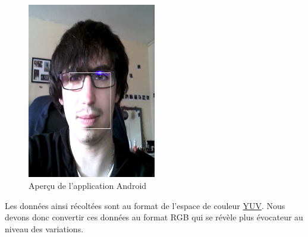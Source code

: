 \begin{figure}[h!]
	\centering
	\includegraphics[width=0.5\textwidth]{data/appAndroid.png}
	\caption{Aperçu de l'application Android}
\end{figure}

Les données ainsi récoltées sont au format de l'espace de couleur \href{http://fr.wikipedia.org/wiki/YUV}{YUV}. Nous devons donc convertir ces données au format RGB qui se révèle plus évocateur au niveau des variations.


